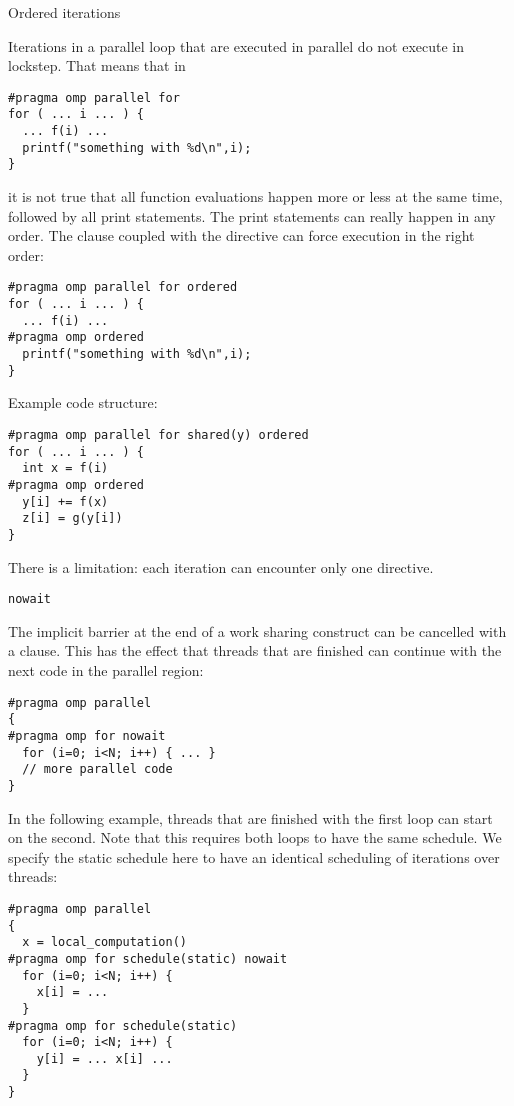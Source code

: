 \begin{comment}
  \begin{exercise}
    Can you rewrite the preceding code example so that it can be
    collapsed?
    Do timing tests to see if you can notice the improvement from collapsing.
  \end{exercise}
\end{comment}

 {Ordered iterations}
\label{sec:omp-ordered}

Iterations in a parallel loop that are executed in parallel do not
execute in lockstep. That means that in
\begin{lstlisting}
#pragma omp parallel for
for ( ... i ... ) {
  ... f(i) ...
  printf("something with %d\n",i);
}
\end{lstlisting}
it is not true that all function evaluations happen more or less at
the same time, followed by all print statements. The print statements
can really happen in any order. The  clause
coupled with the  directive can
force execution in the right order:
\begin{lstlisting}
#pragma omp parallel for ordered
for ( ... i ... ) {
  ... f(i) ...
#pragma omp ordered
  printf("something with %d\n",i);
}
\end{lstlisting}
Example code structure:
\begin{lstlisting}
#pragma omp parallel for shared(y) ordered
for ( ... i ... ) {
  int x = f(i)
#pragma omp ordered
  y[i] += f(x)
  z[i] = g(y[i])
}
\end{lstlisting}
There is a limitation:
each iteration can encounter only one  directive.

 {\texttt{nowait}}
\label{sec:omp-nowait}

The implicit barrier at the end of a work sharing construct
can be cancelled with a  clause.
This has the effect that threads that are finished can continue
with the next code in the parallel region:
\begin{lstlisting}
#pragma omp parallel
{
#pragma omp for nowait
  for (i=0; i<N; i++) { ... }
  // more parallel code
}
\end{lstlisting}

In the following example, threads that are finished with the first loop
can start on the second. Note that this requires both loops to have
the same schedule. We specify the static schedule here to have an
identical scheduling of iterations over threads:
\begin{lstlisting}
#pragma omp parallel
{
  x = local_computation()
#pragma omp for schedule(static) nowait
  for (i=0; i<N; i++) { 
    x[i] = ... 
  }
#pragma omp for schedule(static)
  for (i=0; i<N; i++) { 
    y[i] = ... x[i] ...
  }
}
\end{lstlisting}

